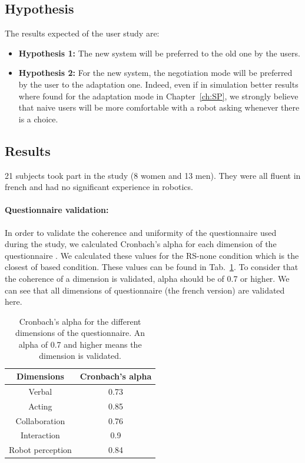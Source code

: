 \documentclass[english,a4paper,11pt,twoside]{StyleThese}
\begin{document}
\subsection{Hypothesis} 
\label{subsec:hypothesis}

The results expected of the user study are:
\begin{itemize}
\item \textbf{Hypothesis 1:} The new system will be preferred to the old one by the users.
\item \textbf{Hypothesis 2:} For the new system, the negotiation mode will be preferred by the user to the adaptation one. Indeed, even if in simulation better results where found for the adaptation mode in Chapter~\ref{ch:SP}, we strongly believe that naive users will be more comfortable with a robot asking whenever there is a choice.
\end{itemize}


\newpage
\subsection{Results}

21 subjects took part in the study (8 women and 13 men). They were all fluent in french and had no significant experience in robotics.


\paragraph{Questionnaire validation:}
In order to validate the coherence and uniformity of the questionnaire used during the study, we calculated Cronbach's alpha for each dimension of the questionnaire \cite{cronbach1951coefficient}. We calculated these values for the RS-none condition which is the closest of based condition. These values can be found in Tab.~\ref{tab:validationQuestionnaire}. To consider that the coherence of a dimension is validated, alpha should be of 0.7 or higher. We can see that all dimensions of questionnaire (the french version) are validated here. 

\begin{table}[!h]
\centering
  \begin{tabular}{|c|c|}
  \hline
    \textbf{Dimensions} & \textbf{Cronbach's alpha} \\
  \hline
  	Verbal & 0.73 \\
  \hline
  	Acting & 0.85 \\
  \hline
  	Collaboration & 0.76 \\
  \hline
  	Interaction & 0.9 \\
  \hline
  	Robot perception & 0.84 \\
  \hline
  \end{tabular}
   \caption{Cronbach's alpha for the different dimensions of the questionnaire. An alpha of 0.7 and higher means the dimension is validated.}
   \label{tab:validationQuestionnaire}
\end{table}
\end{document}
